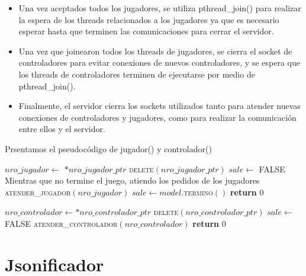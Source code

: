 \documentclass[a4paper,10pt,twoside]{article}
\newenvironment{pseudo}[1][]{%
    \vspace{0.5em}%
    \begin{algorithmic}%
}
{%
    \end{algorithmic}%
    \vspace{0.5em}%
}
\newcommand{\Fn}[2]{\textsc{#1}$(#2)$}
\newcommand{\PReturn}[1]{\textbf{return} $#1$}
\newcommand{\PNot}{\textbf{not} }
\newcommand{\PTrue}{\textnormal{TRUE} }
\newcommand{\PFalse}{\textnormal{FALSE} }
\begin{document}
\begin{itemize}
    \item Una vez aceptados todos los jugadores, se utiliza pthread\_join() para realizar la espera de los threads relacionados a los jugadores ya que es necesario esperar hasta que terminen las comunicaciones para cerrar el servidor.
    
    \item Una vez que joinearon todos los threads de jugadores, se cierra el socket de controladores para evitar conexiones de nuevos controladores, y se espera que los threads de controladores terminen de ejecutarse por medio de pthread\_join().

    \item Finalmente, el servidor cierra los sockets utilizados tanto para atender nuevas conexiones de controladores y jugadores, como para realizar la comunicación entre ellos y el servidor.
\end{itemize}

Prsentamos el pseudocódigo de jugador() y controlador()

\begin{pseudo}
        \State $nro\_jugador \leftarrow$ $*nro\_jugador\_ptr$
        \State \Fn{delete}{nro\_jugador\_ptr}
        \State $sale \leftarrow$ \PFalse
        \State
        \State Mientras que no termine el juego, atiendo los pedidos de los jugadores
        \State
        \While{\PNot $sale$}
            \State \Fn{atender\_jugador}{nro\_jugador}
            \State $sale \leftarrow model.$\Fn{termino}{}
        \EndWhile
        \State \PReturn{0}
    \EndProcedure
\end{pseudo}

\begin{pseudo}
        \State $nro\_controlador \leftarrow *nro\_controlador\_ptr$
        \State \Fn{delete}{nro\_controlador\_ptr}
        \State $sale \leftarrow$ \PFalse
        \While{\PTrue}
            \State \Fn{atender\_controlador}{nro\_controlador}
        \EndWhile
        \State \PReturn{0}
    \EndProcedure
\end{pseudo}




\section{Jsonificador}
\end{document}
